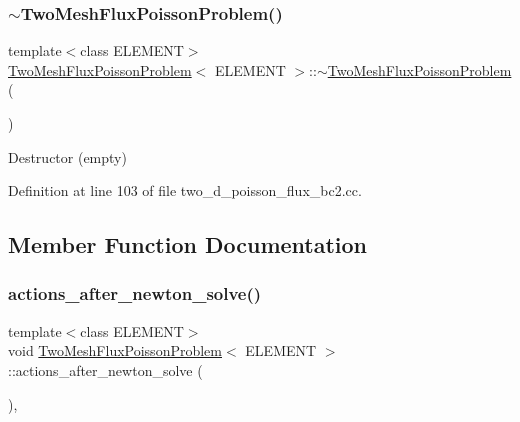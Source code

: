 \subsubsection{\texorpdfstring{$\sim$\+Two\+Mesh\+Flux\+Poisson\+Problem()}{~TwoMeshFluxPoissonProblem()}}
{\footnotesize\ttfamily template$<$class E\+L\+E\+M\+E\+NT$>$ \\
\hyperlink{classTwoMeshFluxPoissonProblem}{Two\+Mesh\+Flux\+Poisson\+Problem}$<$ E\+L\+E\+M\+E\+NT $>$\+::$\sim$\hyperlink{classTwoMeshFluxPoissonProblem}{Two\+Mesh\+Flux\+Poisson\+Problem} (\begin{DoxyParamCaption}{ }\end{DoxyParamCaption})\hspace{0.3cm}{\ttfamily [inline]}}



Destructor (empty) 



Definition at line 103 of file two\+\_\+d\+\_\+poisson\+\_\+flux\+\_\+bc2.\+cc.



\subsection{Member Function Documentation}
\mbox{\label{classTwoMeshFluxPoissonProblem_a9b3da753ba1d924b920e2e67779e7453}} 
\subsubsection{\texorpdfstring{actions\+\_\+after\+\_\+newton\+\_\+solve()}{actions\_after\_newton\_solve()}}
{\footnotesize\ttfamily template$<$class E\+L\+E\+M\+E\+NT$>$ \\
void \hyperlink{classTwoMeshFluxPoissonProblem}{Two\+Mesh\+Flux\+Poisson\+Problem}$<$ E\+L\+E\+M\+E\+NT $>$\+::actions\+\_\+after\+\_\+newton\+\_\+solve (\begin{DoxyParamCaption}{ }\end{DoxyParamCaption})\hspace{0.3cm}{\ttfamily [inline]}, {\ttfamily [private]}}



